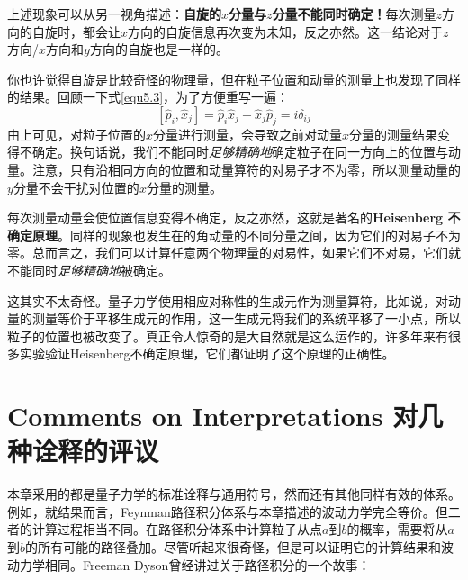 上述现象可以从另一视角描述：{\bfseries 自旋的$x$分量与$z$分量不能同时确定！}每次测量$z$方向的自旋时，都会让$x$方向的自旋信息再次变为未知，反之亦然。这一结论对于$z$ 方向/$x$方向和$y$方向的自旋也是一样的。

你也许觉得自旋是比较奇怪的物理量，但在粒子位置和动量的测量上也发现了同样的结果。回顾一下式\eqref{equ5.3}，为了方便重写一遍：
\begin{equation}
\label{equ8.61}
	[\hat p_i,\hat x_j]=\hat p_i \hat x_j - \hat x_j \hat p_j =i \delta_{ij}
\end{equation}
由上可见，对粒子位置的$x$分量进行测量，会导致之前对动量$x$分量的测量结果变得不确定。换句话说，我们不能同时{\itshape 足够精确地}确定粒子在同一方向上的位置与动量。注意，只有沿相同方向的位置和动量算符的对易子才不为零，所以测量动量的$y$分量不会干扰对位置的$x$分量的测量。

每次测量动量会使位置信息变得不确定，反之亦然，这就是著名的{\bfseries Heisenberg 不确定原理}。同样的现象也发生在的角动量的不同分量之间，因为它们的对易子不为零。总而言之，我们可以计算任意两个物理量的对易性，如果它们不对易，它们就不能同时{\itshape 足够精确地}被确定。

这其实不太奇怪。量子力学使用相应对称性的生成元作为测量算符，比如说，对动量的测量等价于平移生成元的作用，这一生成元将我们的系统平移了一小点，所以粒子的位置也被改变了。真正令人惊奇的是大自然就是这么运作的，许多年来有很多实验验证Heisenberg不确定原理，它们都证明了这个原理的正确性。



\section[对几种诠释的评议]{Comments on Interpretations \quad 对几种诠释的评议}\label{sec8.7}
本章采用的都是量子力学的标准诠释与通用符号，然而还有其他同样有效的体系。例如，就结果而言，Feynman路径积分体系与本章描述的波动力学完全等价。但二者的计算过程相当不同。在路径积分体系中计算粒子从点$a$到$b$的概率，需要将从$a$到$b$的所有可能的路径叠加。尽管听起来很奇怪，但是可以证明它的计算结果和波动力学相同。Freeman Dyson曾经讲过关于路径积分的一个故事：

